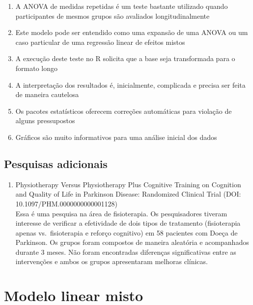 \documentclass[
]{book}
\providecommand{\tightlist}{%
  \setlength{\itemsep}{0pt}\setlength{\parskip}{0pt}}
\begin{document}
\begin{enumerate}
\def\labelenumi{\arabic{enumi}.}
\tightlist
\item
  A ANOVA de medidas repetidas é um teste bastante utilizado quando participantes de mesmos grupos são avaliados longitudinalmente\\
\item
  Este modelo pode ser entendido como uma expansão de uma ANOVA ou um caso particular de uma regressão linear de efeitos mistos\\
\item
  A execução deste teste no R solicita que a base seja transformada para o formato longo\\
\item
  A interpretação dos resultados é, inicialmente, complicada e precisa ser feita de maneira cautelosa\\
\item
  Os pacotes estatísticos oferecem correções automáticas para violação de alguns pressupostos\\
\item
  Gráficos são muito informativos para uma análise inicial dos dados\\
\end{enumerate}

\hypertarget{pesquisas-adicionais-5}{%
\section{Pesquisas adicionais}\label{pesquisas-adicionais-5}}

\begin{enumerate}
\def\labelenumi{\arabic{enumi}.}
\tightlist
\item
  Physiotherapy Versus Physiotherapy Plus Cognitive Training on Cognition and Quality of Life in Parkinson Disease: Randomized Clinical Trial (DOI: 10.1097/PHM.0000000000001128)\\
  Essa é uma pesquisa na área de fisioterapia. Os pesquisadores tiveram interesse de verificar a efetividade de dois tipos de tratamento (fisioterapia apenas vs.~fisioterapia e reforço cognitivo) em 58 pacientes com Doeça de Parkinson. Os grupos foram compostos de maneira aleatória e acompanhados durante 3 meses. Não foram encontradas diferenças significativas entre as intervenções e ambos os grupos apresentaram melhoras clínicas.
\end{enumerate}

\hypertarget{modelo-linear-misto}{%
\chapter{Modelo linear misto}\label{modelo-linear-misto}}
\end{document}
